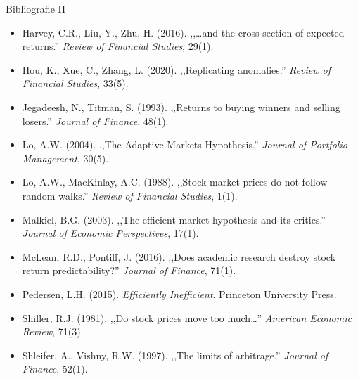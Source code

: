\documentclass[9pt, aspectratio=169, t]{beamer}
\theoremstyle{definition}
\newenvironment{cminipage}[1]{%
    \par\noindent\hfill\begin{minipage}{#1}\ignorespaces
}{%
    \end{minipage}\hfill\null\par
}
\begin{document}
\begin{frame}{Bibliografie II}
\begin{cminipage}{0.95\textwidth}
{\small
\begin{itemize}\setlength{\itemsep}{2pt}
    \item Harvey, C.R., Liu, Y., Zhu, H. (2016). ,,\ldots and the cross-section of expected returns.'' \textit{Review of Financial Studies}, 29(1).
    \item Hou, K., Xue, C., Zhang, L. (2020). ,,Replicating anomalies.'' \textit{Review of Financial Studies}, 33(5).
    \item Jegadeesh, N., Titman, S. (1993). ,,Returns to buying winners and selling losers.'' \textit{Journal of Finance}, 48(1).
    \item Lo, A.W. (2004). ,,The Adaptive Markets Hypothesis.'' \textit{Journal of Portfolio Management}, 30(5).
    \item Lo, A.W., MacKinlay, A.C. (1988). ,,Stock market prices do not follow random walks.'' \textit{Review of Financial Studies}, 1(1).
    \item Malkiel, B.G. (2003). ,,The efficient market hypothesis and its critics.'' \textit{Journal of Economic Perspectives}, 17(1).
    \item McLean, R.D., Pontiff, J. (2016). ,,Does academic research destroy stock return predictability?'' \textit{Journal of Finance}, 71(1).
    \item Pedersen, L.H. (2015). \textit{Efficiently Inefficient}. Princeton University Press.
    \item Shiller, R.J. (1981). ,,Do stock prices move too much\ldots'' \textit{American Economic Review}, 71(3).
    \item Shleifer, A., Vishny, R.W. (1997). ,,The limits of arbitrage.'' \textit{Journal of Finance}, 52(1).
\end{itemize}
}
\end{cminipage}
\end{frame}
\end{document}
